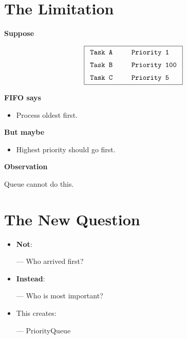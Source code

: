 \documentclass[11pt,a4paper]{book}
\begin{document}





\section{The Limitation}

\textbf{Suppose}

\[
\boxed{
\begin{array}{l}
\texttt{Task A \qquad Priority 1}\\[2mm]
\texttt{Task B \qquad Priority 100}\\[2mm]
\texttt{Task C \qquad Priority 5}
\end{array}
}
\]

\medskip

\textcolor{RosettaBlue}{\textbf{FIFO says}}

\begin{itemize}[leftmargin=2em]
\item Process oldest first.
\end{itemize}

\medskip

\textcolor{RosettaJade}{\textbf{But maybe}}

\begin{itemize}[leftmargin=2em]
\item Highest priority should go first.
\end{itemize}

\medskip

\textcolor{RosettaRed}{\textbf{Observation}}

Queue cannot do this.

\section{The New Question}
\begin{itemize}
\item \textbf{\textcolor{RosettaOrange}{Not}}:

    --- Who arrived first?

\item \textbf{\textcolor{RosettaSeaGreen}{Instead}}:

    --- Who is most important?

\item This creates:

    --- {\ttfamily\textcolor{RosettaDeepGreen}{PriorityQueue}}
\end{itemize}
\end{document}

